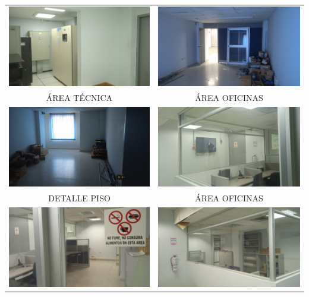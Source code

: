 \documentclass[12pt,a4paper,twoside]{article}
\begin{document}
\begin{tabular}{ c c }
	
	\includegraphics[width = 7 cm]{Imagenes/25} & \includegraphics[width = 7 cm]{Imagenes/26} \\
	ÁREA TÉCNICA & ÁREA OFICINAS\\
	\includegraphics[width = 7 cm]{Imagenes/27} & \includegraphics[width = 7 cm]{Imagenes/28} \\
	DETALLE PISO & ÁREA OFICINAS\\
		\includegraphics[width = 7 cm]{Imagenes/29} & \includegraphics[width = 7 cm]{Imagenes/30} \\

\end{tabular}
\end{document}
